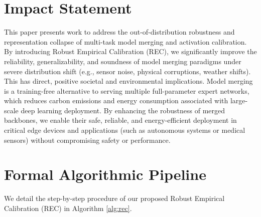 \documentclass{article}
\theoremstyle{plain}
\theoremstyle{definition}
\theoremstyle{remark}
\begin{document}
\section*{Impact Statement}
This paper presents work to address the out-of-distribution robustness and representation collapse of multi-task model merging and activation calibration. By introducing Robust Empirical Calibration (REC), we significantly improve the reliability, generalizability, and soundness of model merging paradigms under severe distribution shift (e.g., sensor noise, physical corruptions, weather shifts). This has direct, positive societal and environmental implications. Model merging is a training-free alternative to serving multiple full-parameter expert networks, which reduces carbon emissions and energy consumption associated with large-scale deep learning deployment. By enhancing the robustness of merged backbones, we enable their safe, reliable, and energy-efficient deployment in critical edge devices and applications (such as autonomous systems or medical sensors) without compromising safety or performance.

\clearpage



\clearpage
\onecolumn
\appendix
{}

\section{Formal Algorithmic Pipeline}
\label{sec:algorithm_appendix}
We detail the step-by-step procedure of our proposed Robust Empirical Calibration (REC) in Algorithm \ref{alg:rec}.
\end{document}
